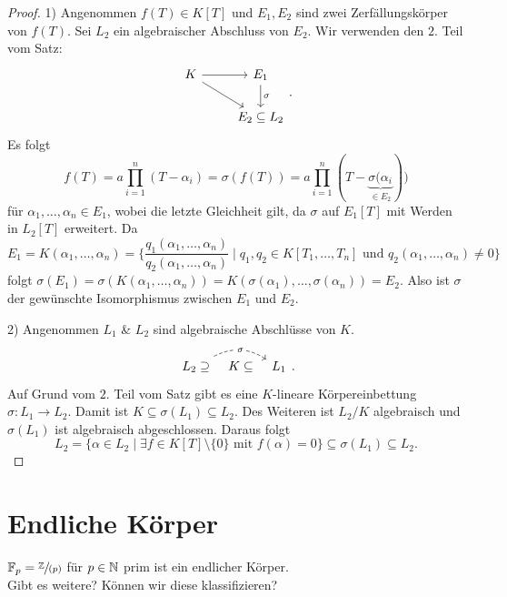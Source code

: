 \begin{proof}
	1) Angenommen $f(T) \in K[T]$ und $E_1,E_2$ sind zwei Zerfällungskörper von $f(T)$.
	Sei $L_2$ ein algebraischer Abschluss von $E_2$. Wir verwenden den $2.$ Teil vom Satz:
	\[
		\begin{tikzcd}
			K \arrow[r] \arrow[rd] & E_1 \arrow[d, "\sigma"] \\
                       & E_2 \subseteq L_2      
		\end{tikzcd}
	.\] 
	Es folgt 
	\[
		f(T) = a \prod_{i=1}^{n} (T-\alpha_{i}) = \sigma(f(T)) = a \prod_{i=1}^{n} (T - \underbrace{\sigma(\alpha_{i}}_{\in E_{2}}))
	\]
	für $\alpha_1,\ldots,\alpha_{n} \in E_1$, wobei die letzte Gleichheit gilt, da $\sigma$ auf $E_1[T]$ mit Werden in $L_{2}[T]$ erweitert.
	Da 
	\[
		E_1 = K(\alpha_1,\ldots,\alpha_{n}) = \{\frac{q_1(\alpha_1,\ldots,\alpha_{n})}{q_2(\alpha_1,\ldots,\alpha_{n})} \mid q_1,q_2 \in K[T_1,\ldots,T_{n}] \text{ und } q_2(\alpha_1,\ldots,
		\alpha_{n}) \neq 0\} 
	\]
	folgt $\sigma(E_1) = \sigma(K(\alpha_1,\ldots,\alpha_{n})) = K(\sigma(\alpha_1),\ldots, \sigma(\alpha_{n})) = E_2$. 
	Also ist $\sigma$ der gewünschte Isomorphismus zwischen $E_1$ und $E_2$.

	2) Angenommen $L_1$ \& $L_2$ sind algebraische Abschlüsse von $K$.
	\[
		\begin{tikzcd}[column sep=tiny]
			L_2 \supseteq \arrow[rr, "\sigma" description, dashed, bend left] & K \subseteq & L_1
		\end{tikzcd}
	.\] 
	Auf Grund vom $2.$ Teil vom Satz gibt es eine $K$-lineare Körpereinbettung $\sigma: L_1 \to L_2$.
	Damit ist $K \subseteq \sigma(L_1) \subseteq L_2$. Des Weiteren ist $L_2 / K$ algebraisch und $\sigma(L_1)$ ist
	algebraisch abgeschlossen. Daraus folgt
	\[
		L_2 = \{\alpha \in L_2 \mid \exists f \in K[T] \setminus \{0\} \text{ mit } f(\alpha) = 0\} \subseteq \sigma(L_1) \subseteq L_2 
	.\] 
\end{proof}

\section{Endliche Körper}
$\mathbb{F}_{p} = \sfrac{\mathbb{Z}}{(p)}$ für $p \in \mathbb{N}$ prim ist ein endlicher Körper.\\
Gibt es weitere? Können wir diese klassifizieren?

